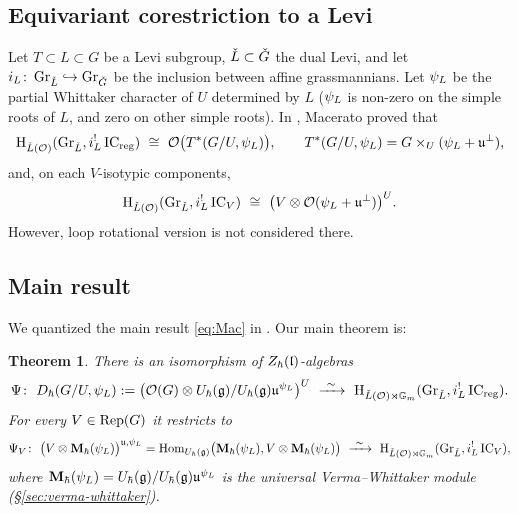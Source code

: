\documentclass{article}
\theoremstyle{plain}
\newtheorem{theorem}{Theorem}[section]
\theoremstyle{definition}
\theoremstyle{remark}
\numberwithin{equation}{section}
\begin{document}
\subsection{Equivariant corestriction to a Levi}\label{sec:intro-levi}
Let $T\subset L\subset G$ be a Levi subgroup, $\check{L}\subset{\check{G}}$ the dual Levi, and let $i_L\colon\operatorname{Gr}_{\check{L}}\hookrightarrow\operatorname{Gr}_{{\check{G}}}$ be the inclusion between affine grassmannians. Let $\psi_L$ be the partial Whittaker character of $U$ determined by $L$ ($\psi_L$ is non-zero on the simple roots of $L$, and zero on other simple roots). In \cite[Theorem 1.5.2, Corollary 1.5.4]{macerato2023leviequivariantrestrictionsphericalperverse}, Macerato proved that
\begin{equation}\label{eq:Mac}
\H_{\cL(\calO)}(\GrL,i_L^!\IC_\reg)\ \cong\ \calO\bigl(T^*(G/U,\psiL)\bigr),\qquad T^*(G/U,\psiL)=G\times_U(\psiL+\fraku^\perp),
\end{equation}
and, on each $V$-isotypic components,
\begin{equation}\label{eq:Mac-V}
\H_{\cL(\calO)}(\GrL,i_L^!\IC_V)\ \cong\ \bigl(V\otimes\calO(\psiL+\fraku^\perp)\bigr)^U .
\end{equation}
However, loop rotational version is not considered there.

\subsection{Main result}\label{sec:intro-main}
We quantized the main result \eqref{eq:Mac} in \cite{macerato2023leviequivariantrestrictionsphericalperverse}. Our main theorem is:
\begin{theorem}\label{thm:main}
There is an isomorphism of $Z_\hbar(\mathfrak{l})$-algebras
\begin{equation}\label{eq:main}
\Psi\colon\ \Dh(G/U,\psiL):=\bigl(\calO(G)\otimes \Uh(\frakg)/\Uh(\frakg)\fraku^{\psiL}\bigr)^{U}\ \xrightarrow{\ \sim\ }\ \H_{\LO}(\GrL,i_L^!\IC_\reg).
\end{equation}
For every $V\in\operatorname{Rep}(G)$ it restricts to
\begin{equation}\label{eq:main-V}
\Psi_V\colon\ \bigl(V\otimes\bM_\hbar(\psiL)\bigr)^{\fraku,\psiL}=\Hom_{\Uh(\frakg)}\bigl(\bM_\hbar(\psiL),V\otimes\bM_\hbar(\psiL)\bigr)\ \xrightarrow{\ \sim\ }\ \H_{\LO}(\GrL,i_L^!\IC_V),
\end{equation}
where $\mathbf{M}_\hbar(\psi_L)=U_\hbar(\mathfrak{g})/U_\hbar(\mathfrak{g})\mathfrak{u}^{\psi_L}$ is the universal Verma--Whittaker module (\S\ref{sec:verma-whittaker}).
\end{theorem}
\end{document}
